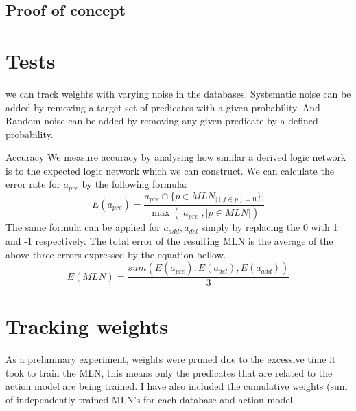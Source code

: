 \subsection{Proof of concept}
\section{Tests}
we can track weights with varying noise in the databases. Systematic noise can be added by removing a target set of predicates with a given probability. And Random noise can be added by removing any given predicate by a defined probability. 

Accuracy
We measure accuracy by analysing how similar a derived logic network is to the expected logic network which we can construct. We can calculate the error rate for \(a_{pre}\) by the following formula:
\[E(a_{pre})=\frac{a_{pre}\cap \{p\in MLN_{|(f\in p) =0}\}|}{\max( |a_{pre}|,|p\in MLN|)}\]
The same formula can be applied for \(a_{add},a_{del}\) simply by replacing the 0 with 1 and -1 respectively. The total error of the resulting MLN is the average of the above three errors expressed by the equation bellow.
\[E(MLN)=\frac{sum(E(a_{pre}),E(a_{del}),E(a_{add}))}{3}\]

\section{Tracking weights}
As a preliminary experiment, weights were pruned due to the excessive time it took to train the MLN, this means only the predicates that are related to the action model are being trained.
I have also included the cumulative weights (sum of independently trained MLN's for each database and action model.



